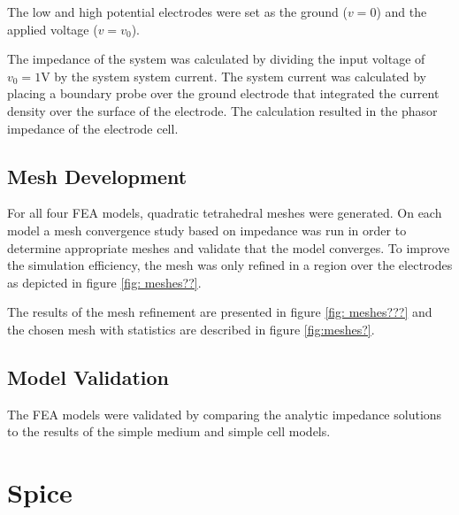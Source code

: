 \par The low and high potential electrodes were set as the ground ($v=0$) and the applied voltage ($v=v_0$).

\par The impedance of the system was calculated by dividing the input voltage of $v_0 = 1$V by the system system current. The system current was calculated by placing a boundary probe over the ground electrode that integrated the current density over the surface of the electrode. The calculation resulted in the phasor impedance of the electrode cell. 

\subsection{Mesh Development}
\par For all four FEA models, quadratic tetrahedral meshes were generated. On each model a mesh convergence study based on impedance was run in order to determine appropriate meshes and validate that the model converges. To improve the simulation efficiency, the mesh was only refined in a region over the electrodes as depicted in figure \ref{fig: meshes??}.

\par The results of the mesh refinement are presented in figure \ref{fig: meshes???} and the chosen mesh with statistics are described in figure \ref{fig:meshes?}.


\subsection{Model Validation}
\par The FEA models were validated by comparing the analytic impedance solutions to the results of the simple medium and simple cell models. 


\section{Spice}